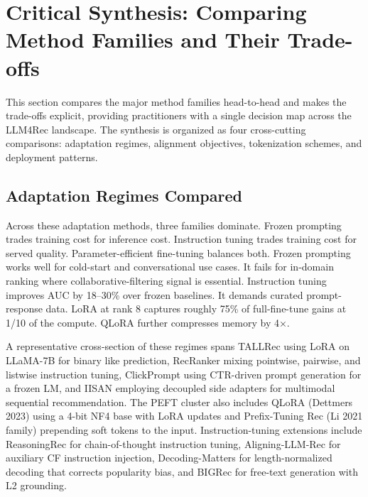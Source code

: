 \documentclass{article}
\begin{document}
\section{Critical Synthesis: Comparing Method Families and Their Trade-offs}\label{critical-synthesis-comparing-method-families-and-their-trade-offs}

This section compares the major method families head-to-head and makes the trade-offs explicit, providing practitioners with a single decision map across the LLM4Rec landscape. The synthesis is organized as four cross-cutting comparisons: adaptation regimes, alignment objectives, tokenization schemes, and deployment patterns.

\subsection{Adaptation Regimes Compared}\label{adaptation-regimes-compared}

Across these adaptation methods, three families dominate. Frozen prompting trades training cost for inference cost. Instruction tuning trades training cost for served quality. Parameter-efficient fine-tuning balances both. Frozen prompting works well for cold-start and conversational use cases. It fails for in-domain ranking where collaborative-filtering signal is essential. Instruction tuning improves AUC by 18--30\% over frozen baselines. It demands curated prompt-response data. LoRA at rank 8 captures roughly 75\% of full-fine-tune gains at 1/10 of the compute. QLoRA further compresses memory by 4×.

A representative cross-section of these regimes spans TALLRec \citep{bao2023arxiv2305004472023} using LoRA on LLaMA-7B for binary like prediction, RecRanker \citep{luo2024recrankerinstructi} mixing pointwise, pairwise, and listwise instruction tuning, ClickPrompt \citep{lin2023clickpromptctrmode} using CTR-driven prompt generation for a frozen LM, and IISAN \citep{fu2024iisanefficientlyad} employing decoupled side adapters for multimodal sequential recommendation. The PEFT cluster also includes QLoRA (Dettmers 2023) using a 4-bit NF4 base with LoRA updates and Prefix-Tuning Rec (Li 2021 family) prepending soft tokens to the input. Instruction-tuning extensions include ReasoningRec \citep{bismay2024arxiv2410231802024} for chain-of-thought instruction tuning, Aligning-LLM-Rec \citep{cao2024aligninglargelangu} for auxiliary CF instruction injection, Decoding-Matters \citep{bao2024decodingmattersadd} for length-normalized decoding that corrects popularity bias, and BIGRec \citep{bao2023arxiv2305004472023} for free-text generation with L2 grounding.
\end{document}
